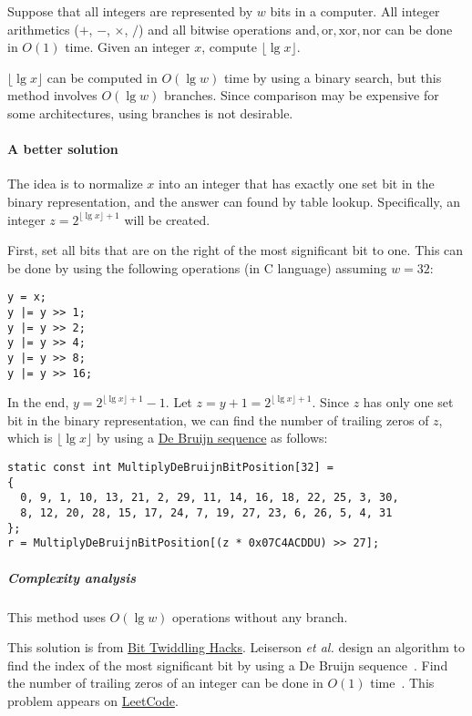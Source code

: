 \begin{Exercise}
Suppose that all integers are represented by $w$ bits in a computer.
All integer arithmetics ($+$, $-$, $\times$, $/$) and all bitwise operations $\text{and}, \text{or}, \text{xor}, \text{nor}$ can be done in $O(1)$ time.
Given an integer $x$, compute $\lfloor \lg x \rfloor$.
\end{Exercise}
\begin{Answer}
$\lfloor \lg x \rfloor$ can be computed in $O(\lg w)$ time by using a binary search, but this method involves $O(\lg w)$ branches.
Since comparison may be expensive for some architectures, using branches is not desirable.
\paragraph{A better solution}
The idea is to normalize $x$ into an integer that has exactly one set bit in the binary representation, and the answer can found by table lookup.
Specifically, an integer $z =  2^{\lfloor \lg x \rfloor + 1}$ will be created.

First, set all bits that are on the right of the most significant bit to one. 
This can be done by using the following operations (in C language) assuming $w = 32$:
\begin{verbatim}
y = x;
y |= y >> 1;
y |= y >> 2;
y |= y >> 4;
y |= y >> 8;
y |= y >> 16;
\end{verbatim}
In the end, $y =  2^{\lfloor \lg x \rfloor + 1} - 1$.
Let $z = y + 1 = 2^{\lfloor \lg x \rfloor + 1}$.
Since $z$ has only one set bit in the binary representation, we can find the number of trailing zeros of $z$, which is $\lfloor \lg x \rfloor$ by using a \href{https://en.wikipedia.org/wiki/De_Bruijn_sequence}{De Bruijn sequence} as follows:
\begin{verbatim}
static const int MultiplyDeBruijnBitPosition[32] = 
{
  0, 9, 1, 10, 13, 21, 2, 29, 11, 14, 16, 18, 22, 25, 3, 30,
  8, 12, 20, 28, 15, 17, 24, 7, 19, 27, 23, 6, 26, 5, 4, 31
};
r = MultiplyDeBruijnBitPosition[(z * 0x07C4ACDDU) >> 27];
\end{verbatim}
\subparagraph{Complexity analysis} This method uses $O(\lg w)$ operations without any branch.
\begin{remark}
This solution is from \href{https://graphics.stanford.edu/~seander/bithacks.html}{Bit Twiddling Hacks}. Leiserson \emph{et al.} design an algorithm to find the index of the most significant bit by using a De Bruijn sequence~\cite{Leiserson1998}. Find the number of trailing zeros of an integer can be done in $O(1)$ time~\cite{Fredman1990}. This problem appears on \href{https://leetcode.com/problems/bitwise-and-of-numbers-range/}{LeetCode}.
\end{remark}
\end{Answer}

